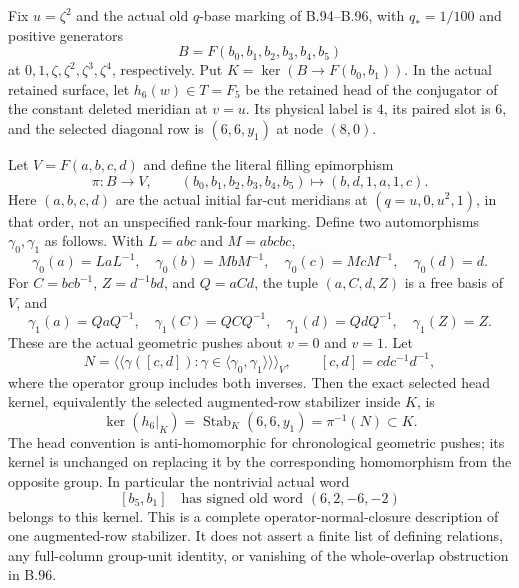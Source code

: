 \label{stmt:B99}
Fix $u=\zeta^2$ and the actual old $q$-base marking of B.94--B.96,
with $q_*=1/100$ and positive generators
\[
 B=F(b_0,b_1,b_2,b_3,b_4,b_5)
\]
at $0,1,\zeta,\zeta^2,\zeta^3,\zeta^4$, respectively.
Put $K=\ker(B\to F(b_0,b_1))$.
In the actual retained surface, let $h_6(w)\in T=F_5$ be the retained
head of the conjugator of the constant deleted meridian at $v=u$.
Its physical label is $4$, its paired slot is $6$, and the selected
diagonal row is $(6,6,y_1)$ at node $(8,0)$.

Let $V=F(a,b,c,d)$ and define the literal filling epimorphism
\begin{equation}\label{eq:B99-old-filling}
 \pi:B\longrightarrow V,
 \qquad (b_0,b_1,b_2,b_3,b_4,b_5)\longmapsto(b,d,1,a,1,c).
\end{equation}
Here $(a,b,c,d)$ are the actual initial far-cut meridians at
$(q=u,0,u^2,1)$, in that order, not an unspecified rank-four marking.
Define two automorphisms $\gamma_0,\gamma_1$ as follows.  With
$L=abc$ and $M=abcbc$,
\begin{equation}\label{eq:B99-gamma0}
 \gamma_0(a)=LaL^{-1},\quad
 \gamma_0(b)=MbM^{-1},\quad
 \gamma_0(c)=McM^{-1},\quad
 \gamma_0(d)=d.
\end{equation}
For $C=bcb^{-1}$, $Z=d^{-1}bd$, and $Q=aCd$, the tuple
$(a,C,d,Z)$ is a free basis of $V$, and
\begin{equation}\label{eq:B99-gamma1}
 \gamma_1(a)=QaQ^{-1},\quad
 \gamma_1(C)=QCQ^{-1},\quad
 \gamma_1(d)=QdQ^{-1},\quad
 \gamma_1(Z)=Z.
\end{equation}
These are the actual geometric pushes about $v=0$ and $v=1$.
Let
\begin{equation}\label{eq:B99-orbit-kernel}
 N=\big\langle\!\big\langle
       \gamma([c,d]):\gamma\in\langle\gamma_0,\gamma_1\rangle
     \big\rangle\!\big\rangle_V,
 \qquad [c,d]=cdc^{-1}d^{-1},
\end{equation}
where the operator group includes both inverses.  Then the exact
selected head kernel, equivalently the selected augmented-row stabilizer
inside $K$, is
\begin{equation}\label{eq:B99-head-kernel}
 \ker(h_6|_K)
   =\operatorname{Stab}_K(6,6,y_1)
   =\pi^{-1}(N)\subset K.
\end{equation}
The head convention is anti-homomorphic for chronological geometric
pushes; its kernel is unchanged on replacing it by the corresponding
homomorphism from the opposite group.
In particular the nontrivial actual word
\begin{equation}\label{eq:B99-geometric-word}
 [b_5,b_1]\quad\text{has signed old word }(6,2,-6,-2)
\end{equation}
belongs to this kernel.
This is a complete operator-normal-closure description of one
augmented-row stabilizer.  It does not assert a finite list of defining
relations, any full-column group-unit identity, or vanishing of the
whole-overlap obstruction in B.96.

